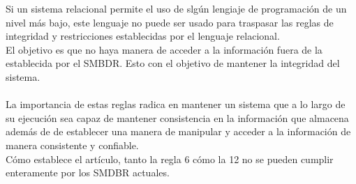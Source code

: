 \documentclass[a4paper, 12pt]{report}
\begin{document}
{\begin{enumerate}
{{    Si un sistema relacional permite el uso de slgún lengiaje de programación de
    un nivel más bajo, este lenguaje no puede ser usado para traspasar las reglas
    de integridad y restricciones establecidas por el lenguaje relacional.}\\
    El objetivo es que no haya manera de acceder a la información fuera de la
    establecida por el SMBDR. Esto con el objetivo de mantener la integridad
    del sistema.\\\\
}
La importancia de estas reglas radica en mantener un sistema que a lo largo de su
ejecución sea capaz de mantener consistencia en la información que almacena además
de de establecer una manera de manipular y acceder a la información de manera
consistente y confiable.\\
Cómo establece el artículo, tanto la regla 6 cómo la 12 no se pueden cumplir
enteramente por los SMDBR actuales.

\end{enumerate}
}
\end{document}
